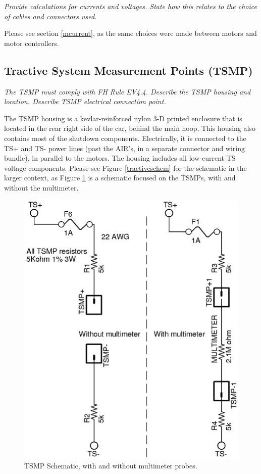 \documentclass{article}
\begin{document}
    \textit{Provide calculations for currents and voltages. State how this relates to the choice of cables and connectors used.}

    Please see section \ref{mcurrent}, as the same choices were made between motors and motor controllers.

    \subsection{Tractive System Measurement Points (TSMP)}

    \textit{The TSMP must comply with FH Rule EV4.4. Describe the TSMP housing and location. Describe TSMP electrical connection point.}

    The TSMP housing is a kevlar-reinforced nylon 3-D printed enclosure that is located in the rear right side of the car, behind the main hoop. This housing also contains most of the shutdown components. Electrically, it is connected to the TS+ and TS- power lines (past the AIR's, in a separate connector and wiring bundle), in parallel to the motors. The housing includes all low-current TS voltage components. Please see Figure \ref{tractiveschem} for the schematic in the larger context, as Figure \ref{tsmpschem} is a schematic focused on the TSMPs, with and without the multimeter.

    \begin{figure}
        \centering
        \includegraphics{TSMP}
        \caption{TSMP Schematic, with and without multimeter probes.}
        \label{tsmpschem}
    \end{figure}
\end{document}
